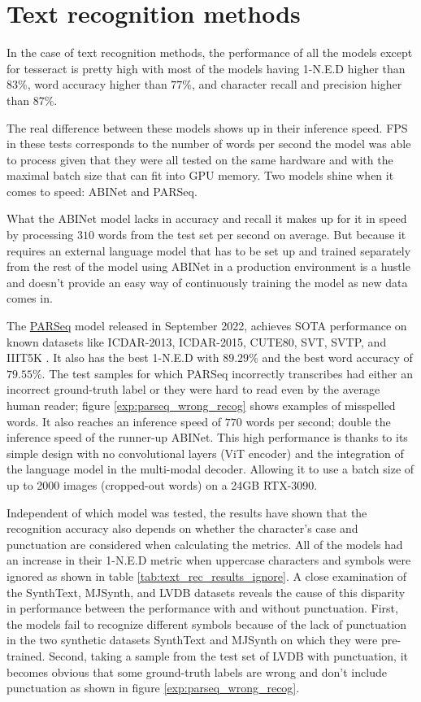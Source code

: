 \section{Text recognition methods}



In the case of text recognition methods, the performance of all the models except for tesseract is pretty high with most of the models having 1-N.E.D higher than $83\%$, word accuracy higher than $77\%$, and character recall and precision higher than $87\%$.

The real difference between these models shows up in their inference speed. FPS in these tests corresponds to the number of words per second the model was able to process given that they were all tested on the same hardware and with the maximal batch size that can fit into GPU memory. Two models shine when it comes to speed: ABINet and PARSeq. 

What the ABINet model lacks in accuracy and recall it makes up for it in speed by processing $310$ words from the test set per second on average. But because it requires an external language model that has to be set up and trained separately from the rest of the model using ABINet in a production environment is a hustle and doesn't provide an easy way of continuously training the model as new data comes in.

The \hyperref[parseq]{PARSeq} model released in September 2022, achieves SOTA performance on known datasets like ICDAR-2013, ICDAR-2015, CUTE80, SVT, SVTP, and IIIT5K \cite{bautista_scene_2022}. It also has the best 1-N.E.D with $89.29\%$ and the best word accuracy of $79.55\%$.
The test samples for which PARSeq incorrectly transcribes had either an incorrect ground-truth label or they were hard to read even by the average human reader; figure \ref{exp:parseq_wrong_recog} shows examples of misspelled words.
It also reaches an inference speed of $770$ words per second; double the inference speed of the runner-up ABINet. This high performance is thanks to its simple design with no convolutional layers (ViT encoder) and the integration of the language model in the multi-modal decoder. Allowing it to use a batch size of up to 2000 images (cropped-out words) on a 24GB RTX-3090.

Independent of which model was tested, the results have shown that the recognition accuracy also depends on whether the character's case and punctuation are considered when calculating the metrics. All of the models had an increase in their 1-N.E.D metric when uppercase characters and symbols were ignored as shown in table \ref{tab:text_rec_results_ignore}. A close examination of the SynthText, MJSynth, and LVDB datasets reveals the cause of this disparity in performance between the performance with and without punctuation. First, the models fail to recognize different symbols because of the lack of punctuation in the two synthetic datasets SynthText and MJSynth on which they were pre-trained. Second, taking a sample from the test set of LVDB with punctuation, it becomes obvious that some ground-truth labels are wrong and don't include punctuation as shown in figure \ref{exp:parseq_wrong_recog}.

